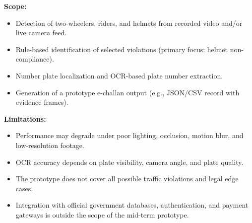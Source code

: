 \textbf{Scope:}
\begin{itemize}[leftmargin=*]
  \item Detection of two-wheelers, riders, and helmets from recorded video and/or live camera feed.
  \item Rule-based identification of selected violations (primary focus: helmet non-compliance).
  \item Number plate localization and OCR-based plate number extraction.
  \item Generation of a prototype e-challan output (e.g., JSON/CSV record with evidence frames).
\end{itemize}

\textbf{Limitations:}
\begin{itemize}[leftmargin=*]
  \item Performance may degrade under poor lighting, occlusion, motion blur, and low-resolution footage.
  \item OCR accuracy depends on plate visibility, camera angle, and plate quality.
  \item The prototype does not cover all possible traffic violations and legal edge cases.
  \item Integration with official government databases, authentication, and payment gateways is outside the scope of the mid-term prototype.
\end{itemize}
